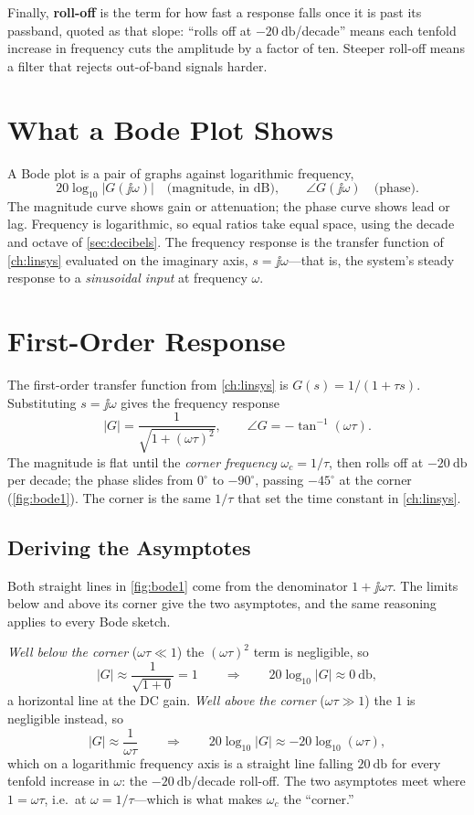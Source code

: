 Finally, \textbf{roll-off} is the term for how fast a response falls once it is
past its passband, quoted as that slope: ``rolls off at
\(-\SI{20}{\decibel}\)/decade'' means each tenfold increase in frequency cuts the
amplitude by a factor of ten. Steeper roll-off means a filter that rejects
out-of-band signals harder.

\section{What a Bode Plot Shows}
A Bode plot is a pair of graphs against logarithmic frequency,
\[
20\log_{10}|G(\jj\omega)|
\quad\text{(magnitude, in dB)},
\qquad
\angle G(\jj\omega)
\quad\text{(phase)}.
\]
The magnitude curve shows gain or attenuation; the phase curve shows lead or lag.
Frequency is logarithmic, so equal ratios take equal space, using the decade and
octave of \cref{sec:decibels}. The frequency response is the transfer function of
\cref{ch:linsys} evaluated on the imaginary axis, \(s=\jj\omega\)---that is, the
system's steady response to a \emph{sinusoidal input} at frequency \(\omega\).
\cite[pp.~47--56]{leigh2012control}

\section{First-Order Response}
The first-order transfer function from \cref{ch:linsys} is
\(G(s)=1/(1+\tau s)\). Substituting \(s=\jj\omega\) gives the frequency
response
\[
|G|=\frac{1}{\sqrt{1+(\omega\tau)^2}},
\qquad
\angle G=-\tan^{-1}(\omega\tau).
\]
The magnitude is flat until the \emph{corner frequency} \(\omega_c=1/\tau\), then
rolls off at \(-\SI{20}{\decibel}\) per decade; the phase slides from \(0^\circ\)
to \(-90^\circ\), passing \(-45^\circ\) at the corner (\cref{fig:bode1}). The
corner is the same \(1/\tau\) that set the time constant in \cref{ch:linsys}.
\cite[pp.~54--58]{leigh2012control}

\subsection{Deriving the Asymptotes}
\label{sec:asymptotes}
Both straight lines in \cref{fig:bode1} come from the denominator
\(1+\jj\omega\tau\). The limits below and above its corner give the two
asymptotes, and the same reasoning applies to every Bode sketch.

\emph{Well below the corner} (\(\omega\tau\ll1\)) the \((\omega\tau)^2\) term is
negligible, so
\[
|G|\approx\frac{1}{\sqrt{1+0}}=1
\qquad\Longrightarrow\qquad
20\log_{10}|G|\approx\SI{0}{\decibel},
\]
a horizontal line at the DC gain. \emph{Well above the corner}
(\(\omega\tau\gg1\)) the \(1\) is negligible instead, so
\[
|G|\approx\frac{1}{\omega\tau}
\qquad\Longrightarrow\qquad
20\log_{10}|G|\approx-20\log_{10}(\omega\tau),
\]
which on a logarithmic frequency axis is a straight line falling
\(\SI{20}{\decibel}\) for every tenfold increase in \(\omega\): the
\(-\SI{20}{\decibel}\)/decade roll-off. The two asymptotes meet where
\(1=\omega\tau\), i.e.\ at \(\omega=1/\tau\)---which is what makes \(\omega_c\) the
``corner.''

